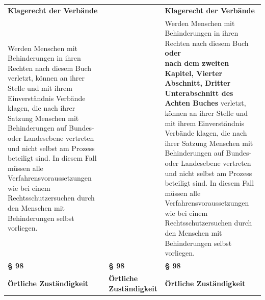 \documentclass[10pt,a4paper,landscape]{article}
\begin{document}
\begin{longtable}{|L{8.2cm}|L{8.2cm}|L{8.2cm}|}
\hhline{|---|}
\textbf{Klagerecht der Verbände} &  & \textbf{Klagerecht der Verbände} \\
\hhline{|---|}
Werden Menschen mit Behinderungen in  \newline ihren Rechten nach diesem Buch verletzt,  \newline können an ihrer Stelle und mit ihrem  \newline Einverständnis Verbände klagen, die nach  \newline ihrer Satzung Menschen mit  \newline Behinderungen auf Bundes- oder  \newline Landesebene vertreten und nicht selbst am  \newline Prozess beteiligt sind. In diesem Fall  \newline müssen alle Verfahrensvoraussetzungen  \newline wie bei einem Rechtsschutzersuchen durch  \newline den Menschen mit Behinderungen selbst  \newline vorliegen. &  & Werden Menschen mit Behinderungen in  \newline ihren Rechten nach diesem Buch \textbf{\textcolor{diffgreen}{oder  \newline nach dem zweiten Kapitel, Vierter  \newline Abschnitt, Dritter Unterabschnitt des  \newline Achten Buches}} verletzt, können an ihrer  \newline Stelle und mit ihrem Einverständnis  \newline Verbände klagen, die nach ihrer Satzung  \newline Menschen mit Behinderungen auf Bundes-  \newline oder Landesebene vertreten und nicht  \newline selbst am Prozess beteiligt sind. In diesem  \newline Fall müssen alle  \newline Verfahrensvoraussetzungen wie bei einem  \newline Rechtsschutzersuchen durch den  \newline Menschen mit Behinderungen selbst  \newline vorliegen. \\
\hhline{|---|}
\textbf{\S{} 98} & \textbf{\S{} 98} & \textbf{\S{} 98} \\
\hhline{|---|}
\textbf{Örtliche Zuständigkeit} & \textbf{Örtliche Zuständigkeit} & \textbf{Örtliche Zuständigkeit} \\

\end{longtable}
\end{document}

